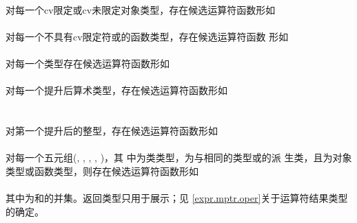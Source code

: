 \paragraph{}
对每一个cv限定或cv未限定对象类型，存在候选运算符函数形如                \\
\mbox{}

\paragraph{}
对每一个不具有cv限定符或的函数类型，存在候选运算符函数
形如                                                                          \\
\mbox{}

\paragraph{}
对每一个类型存在候选运算符函数形如                                      \\
\mbox{}

\paragraph{}
对每一个提升后算术类型，存在候选运算符函数形如                          \\
\mbox{}                            \\
\mbox{}

\paragraph{}
对第一个提升后的整型，存在候选运算符函数形如                            \\
\mbox{}

\paragraph{}
对每一个五元组(, , , , )，其
中为类类型，为与相同的类型或的派
生类，且为对象类型或函数类型，则存在候选运算符函数形如             \\
\mbox{}                                                   \\
其中为和的并集。返回类型只用于展示；见
\ref{expr.mptr.oper}关于运算符结果类型的确定。

